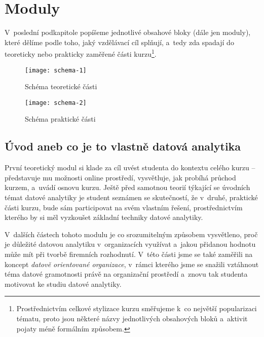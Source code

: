 \hypertarget{moduly}{%
\section{Moduly}\label{moduly}}

V~poslední podkapitole popíšeme jednotlivé obsahové bloky (dále jen moduly), které dělíme podle toho, jaký vzdělávací cíl splňují, a~tedy zda spadají do teoreticky nebo prakticky zaměřené části kurzu\footnote{Prostřednictvím celkové stylizace kurzu směřujeme k~co největší popularizaci tématu, proto jsou některé názvy jednotlivých obsahových bloků a~aktivit pojaty méně formálním způsobem.}.

\begin{figure}[hb!]   
    \centering
    \texttt{[image: schema-1]}  
    \caption{Schéma teoretické části}
    \label{schema-1}
\end{figure}

\begin{figure}[hb!]   
    \centering
    \texttt{[image: schema-2]}  
    \caption{Schéma praktické části}
    \label{schema-2}
\end{figure}

\hypertarget{uxfavod-aneb-co-je-to-vlastnux11b-datovuxe1-analytika}{%
\subsection{Úvod aneb co je to vlastně datová analytika}\label{uxfavod-aneb-co-je-to-vlastnux11b-datovuxe1-analytika}}

První teoretický modul si klade za cíl uvést studenta do kontextu celého kurzu -- představuje mu možnosti online prostředí, vysvětluje, jak probíhá průchod kurzem, a~uvádí osnovu kurzu. Ještě před samotnou teorií týkající se úvodních témat datové analytiky je student seznámen se skutečností, že v~druhé, praktické části kurzu, bude sám participovat na svém vlastním řešení, prostřednictvím kterého by si měl vyzkoušet základní techniky datové analytiky.

V~dalších částech tohoto modulu je co srozumitelným způsobem vysvětleno, proč je důležité datovou analytiku v~organizacích využívat a~jakou přidanou hodnotu může mít při tvorbě firemních rozhodnutí. V~této části jsme se také zaměřili na koncept \emph{datově orientované organizace}, v~rámci kterého jsme se snažili vztáhnout téma datové gramotnosti právě na organizační prostředí a~znovu tak studenta motivovat ke studiu datové analytiky.

